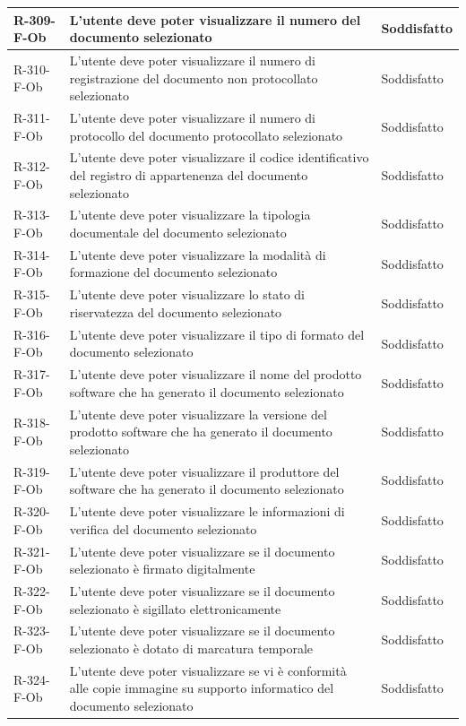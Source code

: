 \begin{longtable}{|p{2.5cm}|p{9.5cm}|p{2.5cm}|}
\hline
R-309-F-Ob & L'utente deve poter visualizzare il numero del documento selezionato & Soddisfatto \\
\hline
R-310-F-Ob & L'utente deve poter visualizzare il numero di registrazione del documento non protocollato selezionato & Soddisfatto \\
\hline
R-311-F-Ob & L'utente deve poter visualizzare il numero di protocollo del documento protocollato selezionato & Soddisfatto \\
\hline
R-312-F-Ob & L'utente deve poter visualizzare il codice identificativo del registro di appartenenza del documento selezionato & Soddisfatto \\
\hline
R-313-F-Ob & L'utente deve poter visualizzare la tipologia documentale del documento selezionato & Soddisfatto \\
\hline
R-314-F-Ob & L'utente deve poter visualizzare la modalità di formazione del documento selezionato & Soddisfatto \\
\hline
R-315-F-Ob & L'utente deve poter visualizzare lo stato di riservatezza del documento selezionato & Soddisfatto \\
\hline
R-316-F-Ob & L'utente deve poter visualizzare il tipo di formato del documento selezionato & Soddisfatto \\
\hline
R-317-F-Ob & L'utente deve poter visualizzare il nome del prodotto software che ha generato il documento selezionato & Soddisfatto \\
\hline
R-318-F-Ob & L'utente deve poter visualizzare la versione del prodotto software che ha generato il documento selezionato & Soddisfatto \\
\hline
R-319-F-Ob & L'utente deve poter visualizzare il produttore del software che ha generato il documento selezionato & Soddisfatto \\
\hline
R-320-F-Ob & L'utente deve poter visualizzare le informazioni di verifica del documento selezionato & Soddisfatto \\
\hline
R-321-F-Ob & L'utente deve poter visualizzare se il documento selezionato è firmato digitalmente & Soddisfatto \\
\hline
R-322-F-Ob & L'utente deve poter visualizzare se il documento selezionato è sigillato elettronicamente & Soddisfatto \\
\hline
R-323-F-Ob & L'utente deve poter visualizzare se il documento selezionato è dotato di marcatura temporale & Soddisfatto \\
\hline
R-324-F-Ob & L'utente deve poter visualizzare se vi è conformità alle copie immagine su supporto informatico del documento selezionato & Soddisfatto \\

\end{longtable}
